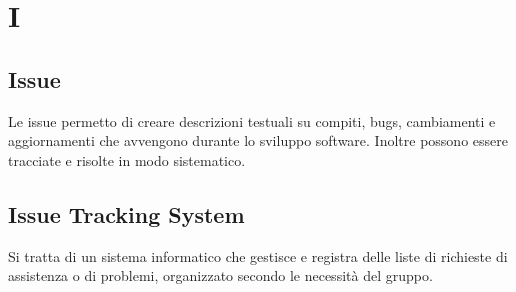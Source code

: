 \section{I}

\subsection{Issue}
Le issue permetto di creare descrizioni testuali su compiti, bugs, cambiamenti e aggiornamenti che avvengono durante lo sviluppo software.  Inoltre possono essere tracciate e risolte in modo sistematico.

\subsection{Issue Tracking System}
Si tratta di un sistema informatico che gestisce e registra delle liste di richieste di assistenza o di problemi, organizzato secondo le necessità del gruppo.
\clearpage